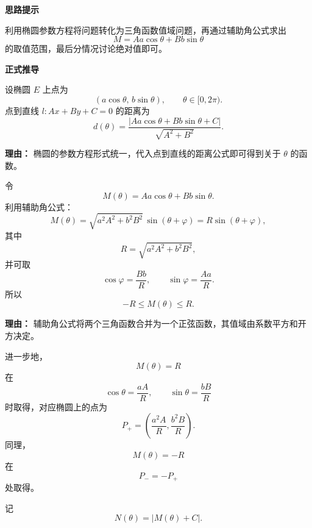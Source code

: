 \begin{proofbox}
	\textbf{\textcolor{CProof}{思路提示}}

	利用椭圆参数方程将问题转化为三角函数值域问题，再通过辅助角公式求出
	\[
		M=Aa\cos\theta+Bb\sin\theta
	\]
	的取值范围，最后分情况讨论绝对值即可。

	\medskip

	\textbf{\textcolor{CProof}{正式推导}}

	\begin{description}[style=nextline, leftmargin=2.8em, labelsep=0.5em, itemsep=0.55em]
		\item[\textbf{步骤一（参数化距离）：}]
		      设椭圆 \(E\) 上点为
		      \[
			      (a\cos\theta,\,b\sin\theta),
			      \qquad \theta\in[0,2\pi).
		      \]
		      点到直线 \(l:Ax+By+C=0\) 的距离为
		      \[
			      d(\theta)
			      =
			      \frac{|Aa\cos\theta+Bb\sin\theta+C|}{\sqrt{A^2+B^2}}.
		      \]

		      \par\textbf{理由：}
		      椭圆的参数方程形式统一，代入点到直线的距离公式即可得到关于 \(\theta\) 的函数。

		\item[\textbf{步骤二（求分子内部的值域）：}]
		      令
		      \[
			      M(\theta)=Aa\cos\theta+Bb\sin\theta.
		      \]
		      利用辅助角公式：
		      \[
			      M(\theta)
			      =
			      \sqrt{a^2A^2+b^2B^2}\,\sin(\theta+\varphi)
			      =
			      R\sin(\theta+\varphi),
		      \]
		      其中
		      \[
			      R=\sqrt{a^2A^2+b^2B^2},
		      \]
		      并可取
		      \[
			      \cos\varphi=\frac{Bb}{R},
			      \qquad
			      \sin\varphi=\frac{Aa}{R}.
		      \]
		      所以
		      \[
			      -R\le M(\theta)\le R.
		      \]

		      \par\textbf{理由：}
		      辅助角公式将两个三角函数合并为一个正弦函数，其值域由系数平方和开方决定。

		      进一步地，
		      \[
			      M(\theta)=R
		      \]
		      在
		      \[
			      \cos\theta=\frac{aA}{R},
			      \qquad
			      \sin\theta=\frac{bB}{R}
		      \]
		      时取得，对应椭圆上的点为
		      \[
			      P_+=\left(\frac{a^2A}{R},\frac{b^2B}{R}\right).
		      \]
		      同理，
		      \[
			      M(\theta)=-R
		      \]
		      在
		      \[
			      P_-=-P_+
		      \]
		      处取得。

		\item[\textbf{步骤三（讨论 \(|M+C|\) 的最值）：}]
		      记
		      \[
			      N(\theta)=|M(\theta)+C|.
		      \]


\end{description}
\end{proofbox}
